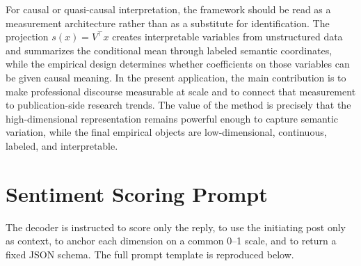 \documentclass[11pt]{article}
\begin{document}
For causal or quasi-causal interpretation, the framework should be read as a measurement architecture rather than as a substitute for identification. The projection $s(x)=V^\top x$ creates interpretable variables from unstructured data and summarizes the conditional mean through labeled semantic coordinates, while the empirical design determines whether coefficients on those variables can be given causal meaning. In the present application, the main contribution is to make professional discourse measurable at scale and to connect that measurement to publication-side research trends. The value of the method is precisely that the high-dimensional representation remains powerful enough to capture semantic variation, while the final empirical objects are low-dimensional, continuous, labeled, and interpretable.

\section{Sentiment Scoring Prompt}
\label{app:sentiment_prompt}

The decoder is instructed to score only the reply, to use the initiating post only as context, to anchor each dimension on a common 0--1 scale, and to return a fixed JSON schema. The full prompt template is reproduced below.
\end{document}
